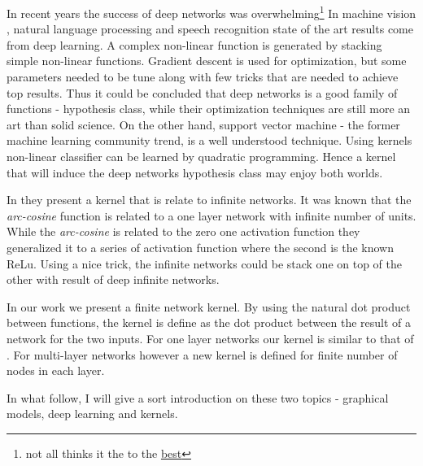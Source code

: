 In recent years the success of deep networks was overwhelming\footnote{not all thinks it the to the \href{https://www.linkedin.com/pulse/computer-vision-research-my-deep-depression-nikos-paragios?trk=hp-feed-article-title-like}{best}}
In machine vision \cite{}, natural language processing \cite{} and speech  recognition state of the art results come from deep learning.
A complex non-linear function is generated by stacking simple non-linear functions.
Gradient descent is used for optimization, but some parameters needed to be tune along with few tricks that are needed to achieve top results.
Thus it could be concluded that deep networks is a good family of functions - hypothesis class, while their optimization techniques are still more an art than solid science.
On the other hand, support vector machine - the former machine learning community trend, is a well understood technique.
Using kernels non-linear classifier can be learned by quadratic programming\cite{}.
Hence a kernel that will induce the deep networks hypothesis class may enjoy both worlds.

In \cite{cho2009kernel} they present a kernel that is relate to infinite networks.
It was known that the \textit{arc-cosine} function is related to a one layer network with infinite number of units.
While the \textit{arc-cosine} is related to the zero one activation function they generalized it to a series of activation function where the second is the known ReLu.
Using a nice trick, the infinite networks could be stack one on top of the other with result of deep infinite networks.

In our work \cite{heinemann2016improper} we present a finite network kernel.
By using the natural dot product between functions, the kernel is define as the dot product between the result of a network for the two inputs.
For one layer networks our kernel is similar to that of \cite{cho2009kernel}.
For multi-layer networks however a new kernel is defined for finite number of nodes in each layer.

In what follow, I will give a sort introduction on these two topics - graphical models, deep learning and kernels.

